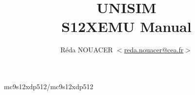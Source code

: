 \documentclass[a4paper,11pt]{article}
\title {UNISIM\\ S12XEMU Manual}
\author {R\'eda NOUACER $<$\url{reda.nouacer@cea.fr}$>$}
\date {}
\begin{document}
\maketitle
 {mc9s12xdp512/mc9s12xdp512}
\end{document}
